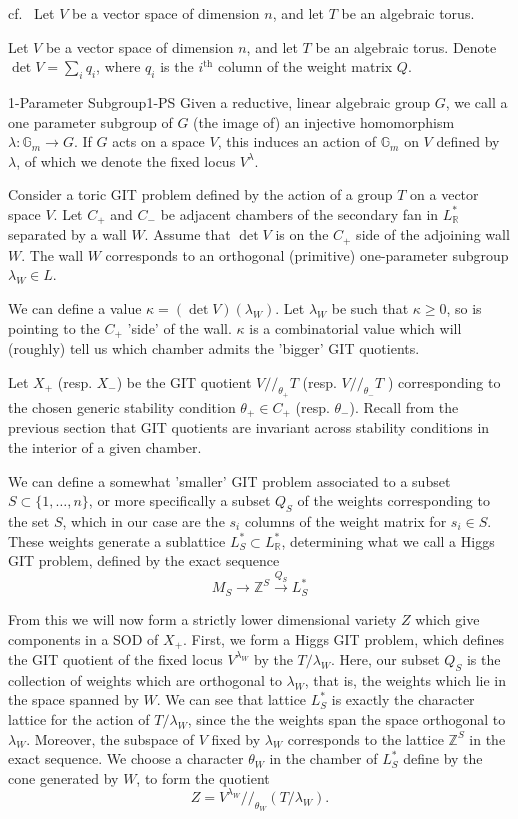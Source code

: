 cf.~\cite*{Kite_2022,ballard2014variation} Let $V$ be a vector space of dimension $n$, and let $T$ be an algebraic torus.

Let $V$ be a vector space of dimension $n$, and let $T$ be an algebraic torus. Denote $\det V = \sum_i q_i$, where $q_i$ is the $i^\mathrm{th}$ column of the weight matrix $Q$. 

\begin{definition}{1-Parameter Subgroup}{1-PS}
    Given a reductive, linear algebraic group $G$, we call a one parameter subgroup of $G$ (the image of) an injective homomorphism $\lambda : \mathbb{G}_{m}\to G$. If $G$ acts on a space $V$, this induces an action of $\mathbb{G}_m$ on $V$ defined by $\lambda$, of which we denote the fixed locus $V^\lambda$. 
\end{definition}

Consider a toric GIT problem defined by the action of a group $T$ on a vector space $V$. Let $C_+$ and $C_-$ be adjacent chambers of the secondary fan in $L^{*}_\mathbb{R}$ separated by a wall $W$. Assume that $\det V$ is on the $C_{+}$ side of the adjoining wall $W$. The wall $W$ corresponds to an orthogonal (primitive) one-parameter subgroup $\lambda_{W}\in L$.

We can define a value $\kappa = (\det V)(\lambda_W)$. Let $\lambda_W$ be such that $\kappa \geq 0$, so is pointing to the $C_+$ 'side' of the wall. $\kappa$ is a combinatorial value which will (roughly) tell us which chamber admits the 'bigger' GIT quotients. 

Let $X_+$ (resp. $X_-$) be the GIT quotient $V // _{\theta_{+}}T$ (resp. $V // _{\theta_{-}}T$ ) corresponding to the chosen generic stability condition $\theta_{+}\in C_+$ (resp. $\theta_-$).  Recall from the previous section that GIT quotients are invariant across stability conditions in the interior of a given chamber. 

We can define a somewhat 'smaller' GIT problem associated to a subset $S \subset \{ 1,\dots,n \}$, or more specifically a subset $Q_S$ of the weights corresponding to the set $S$, which in our case are the $s_i$ columns of the weight matrix for $s_{i}\in S$. These weights generate a sublattice $L_{S}^{*}\subset L_\mathbb{R}^*$, determining what we call a Higgs GIT problem, defined by the exact sequence $$M_{S}\to \mathbb{Z}^{S}\xrightarrow{Q_{S}}L_{S}^{*}$$

From this we will now form a strictly lower dimensional variety $Z$ which give components in a SOD of $X_+$. First, we form a Higgs GIT problem, which defines the GIT quotient of the fixed locus $V^{\lambda_{W}}$ by the $T/\lambda_W$. Here, our subset $Q_S$  is the collection of weights which are orthogonal to $\lambda_W$, that is, the weights which lie in the space spanned by $W$. We can see that lattice $L_S^*$ is exactly the character lattice for the action of $T/\lambda_W$, since the the weights span the space orthogonal to $\lambda_W$. Moreover, the subspace of $V$ fixed by $\lambda_W$ corresponds to the lattice $\mathbb{Z}^S$ in the exact sequence. We choose a character $\theta_W$ in the chamber of $L_{S}^*$ define by the cone generated by $W$, to form the quotient $$Z = V^{\lambda_{W}} / /_{\theta_{W}} \left( T/ \lambda_{W}\right) . $$


